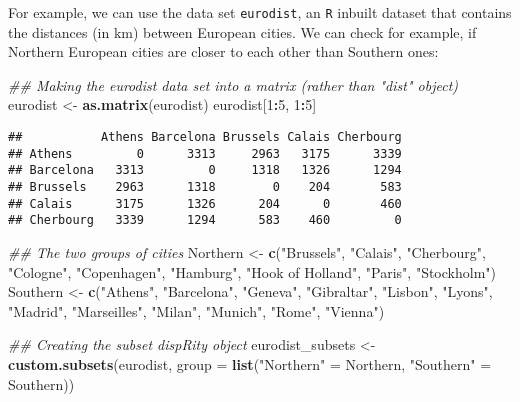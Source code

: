 \documentclass[
]{book}
\newenvironment{Shaded}{\begin{snugshade}}{\end{snugshade}}
\newcommand{\CommentTok}[1]{\textcolor[rgb]{0.56,0.35,0.01}{\textit{#1}}}
\newcommand{\DataTypeTok}[1]{\textcolor[rgb]{0.13,0.29,0.53}{#1}}
\newcommand{\DecValTok}[1]{\textcolor[rgb]{0.00,0.00,0.81}{#1}}
\newcommand{\KeywordTok}[1]{\textcolor[rgb]{0.13,0.29,0.53}{\textbf{#1}}}
\newcommand{\NormalTok}[1]{#1}
\newcommand{\OperatorTok}[1]{\textcolor[rgb]{0.81,0.36,0.00}{\textbf{#1}}}
\newcommand{\StringTok}[1]{\textcolor[rgb]{0.31,0.60,0.02}{#1}}
\begin{document}
For example, we can use the data set \texttt{eurodist}, an \texttt{R} inbuilt dataset that contains the distances (in km) between European cities.
We can check for example, if Northern European cities are closer to each other than Southern ones:

\begin{Shaded}
\begin{Highlighting}[]
\CommentTok{\#\# Making the eurodist data set into a matrix (rather than "dist" object)}
\NormalTok{eurodist \textless{}{-}}\StringTok{ }\KeywordTok{as.matrix}\NormalTok{(eurodist)}
\NormalTok{eurodist[}\DecValTok{1}\OperatorTok{:}\DecValTok{5}\NormalTok{, }\DecValTok{1}\OperatorTok{:}\DecValTok{5}\NormalTok{]}
\end{Highlighting}
\end{Shaded}

\begin{verbatim}
##           Athens Barcelona Brussels Calais Cherbourg
## Athens         0      3313     2963   3175      3339
## Barcelona   3313         0     1318   1326      1294
## Brussels    2963      1318        0    204       583
## Calais      3175      1326      204      0       460
## Cherbourg   3339      1294      583    460         0
\end{verbatim}

\begin{Shaded}
\begin{Highlighting}[]
\CommentTok{\#\# The two groups of cities}
\NormalTok{Northern \textless{}{-}}\StringTok{ }\KeywordTok{c}\NormalTok{(}\StringTok{"Brussels"}\NormalTok{, }\StringTok{"Calais"}\NormalTok{, }\StringTok{"Cherbourg"}\NormalTok{, }\StringTok{"Cologne"}\NormalTok{, }\StringTok{"Copenhagen"}\NormalTok{,}
              \StringTok{"Hamburg"}\NormalTok{, }\StringTok{"Hook of Holland"}\NormalTok{, }\StringTok{"Paris"}\NormalTok{, }\StringTok{"Stockholm"}\NormalTok{)}
\NormalTok{Southern \textless{}{-}}\StringTok{ }\KeywordTok{c}\NormalTok{(}\StringTok{"Athens"}\NormalTok{, }\StringTok{"Barcelona"}\NormalTok{, }\StringTok{"Geneva"}\NormalTok{, }\StringTok{"Gibraltar"}\NormalTok{, }\StringTok{"Lisbon"}\NormalTok{, }\StringTok{"Lyons"}\NormalTok{,}
              \StringTok{"Madrid"}\NormalTok{, }\StringTok{"Marseilles"}\NormalTok{, }\StringTok{"Milan"}\NormalTok{, }\StringTok{"Munich"}\NormalTok{, }\StringTok{"Rome"}\NormalTok{, }\StringTok{"Vienna"}\NormalTok{)}

\CommentTok{\#\# Creating the subset dispRity object}
\NormalTok{eurodist\_subsets \textless{}{-}}\StringTok{ }\KeywordTok{custom.subsets}\NormalTok{(eurodist, }\DataTypeTok{group =} \KeywordTok{list}\NormalTok{(}\StringTok{"Northern"}\NormalTok{ =}\StringTok{ }\NormalTok{Northern,}
                                                        \StringTok{"Southern"}\NormalTok{ =}\StringTok{ }\NormalTok{Southern))}
\end{Highlighting}
\end{Shaded}
\end{document}
